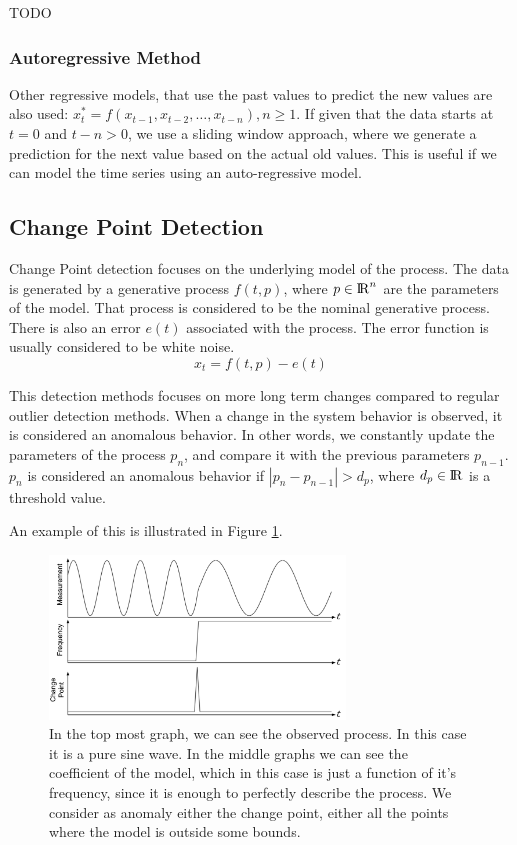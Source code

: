 \documentclass[a4paper, 10pt]{article}
\begin{document}
TODO

\subsubsection{Autoregressive Method}

Other regressive models, that use the past values to predict the new values are also used: $x_t^* = f(x_{t-1}, x_{t-2}, \dots, x_{t-n}), n \ge 1$. If given that the data starts at $t=0$ and $t-n > 0$, we use a sliding window approach, where we generate a prediction for the next value based on the actual old values. This is useful if we can model the time series using an auto-regressive model.

\subsection{Change Point Detection}

Change Point detection focuses on the underlying model of the process. The data is generated by a generative process $f(t, p)$, where $p \in {\rm I\!R}^n$ are the parameters of the model. That process is considered to be the nominal generative process. There is also an error $e(t)$ associated with the process. The error function is usually considered to be white noise.
$$x_t = f(t, p) - e(t)$$

This detection methods focuses on more long term changes compared to regular outlier detection methods. When a change in the system behavior is observed, it is considered an anomalous behavior. In other words, we constantly update the parameters of the process $p_n$, and compare it with the previous parameters $p_{n-1}$. $p_n$ is considered an anomalous behavior if $|p_n - p_{n-1}| > d_p$, where $d_p \in {\rm I\!R}$ is a threshold value.

An example of this is illustrated in Figure \ref{fig:changepoint}.

\begin{figure}
\centering
\includegraphics[width=0.7\textwidth]{ChangePoint}   
\caption{In the top most graph, we can see the observed process. In this case it is a pure sine wave. In the middle graphs we can see the coefficient of the model, which in this case is just a function of it's frequency, since it is enough to perfectly describe the process. We consider as anomaly either the change point, either all the points where the model is outside some bounds.}
\label{fig:changepoint}
\end{figure}
\end{document}
